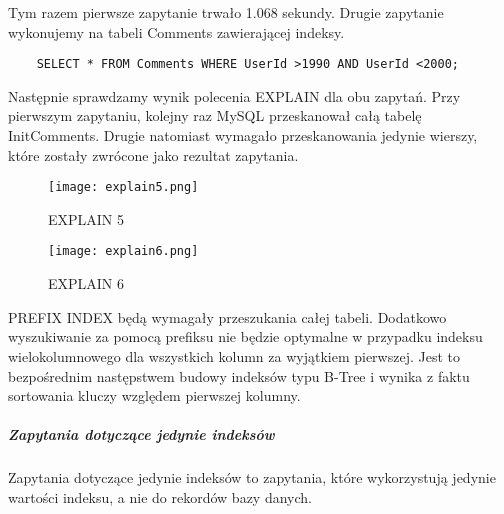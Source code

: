 Tym razem pierwsze zapytanie trwało 1.068 sekundy. Drugie zapytanie wykonujemy na tabeli Comments zawierającej indeksy.
\begin{verbatim}
    SELECT * FROM Comments WHERE UserId >1990 AND UserId <2000;
\end{verbatim}
Następnie sprawdzamy wynik polecenia EXPLAIN dla obu zapytań. Przy pierwszym zapytaniu, kolejny raz MySQL przeskanował całą tabelę Init\textunderscore Comments. Drugie natomiast wymagało przeskanowania jedynie wierszy, które zostały zwrócone jako rezultat zapytania.

\begin{figure}[h]
    \texttt{[image: explain5.png]} 
    \caption{EXPLAIN 5}
\end{figure}

\begin{figure}[h]
    \texttt{[image: explain6.png]} 
    \caption{EXPLAIN 6}
\end{figure}


PREFIX INDEX
będą wymagały przeszukania całej tabeli. Dodatkowo wyszukiwanie za pomocą prefiksu nie będzie optymalne w przypadku indeksu wielokolumnowego dla wszystkich kolumn za wyjątkiem pierwszej. Jest to bezpośrednim następstwem budowy indeksów typu B-Tree i wynika z faktu sortowania kluczy względem pierwszej kolumny.





\subparagraph{Zapytania dotyczące jedynie indeksów}\mbox{}
Zapytania dotyczące jedynie indeksów to zapytania, które wykorzystują jedynie wartości indeksu, a nie do rekordów bazy danych.


\subparagraph{}


